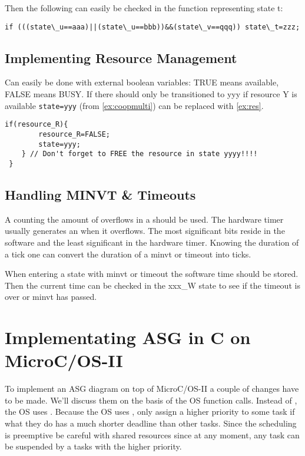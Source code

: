 \documentclass[../main.tex]{subfiles}
\begin{document}
Then the following can easily be checked in the function representing state t:
\begin{center}
\lstinline{if (((state\_u==aaa)||(state\_u==bbb))&&(state\_v==qqq)) state\_t=zzz;}
\end{center}

\subsection{Implementing Resource Management}
Can easily be done with external boolean variables: TRUE means available, FALSE means BUSY.
If there should only be transitioned to yyy if resource Y is available \lstinline{state=yyy} (from \ref{ex:coopmulti}) can be replaced with \ref{ex:res}.

\begin{lstlisting}[caption=Example of implementing resource management., label=ex:res]
	if(resource_R){
		resource_R=FALSE;
		state=yyy;
	} // Don't forget to FREE the resource in state yyyy!!!!
 }
\end{lstlisting}
\subsection{Handling MINVT \& Timeouts}
A  counting the amount of overflows in a  should be used.
The hardware timer usually generates an  when it overflows.
The most significant bits reside in the software and the least significant in the hardware timer.
Knowing the duration of a tick one can convert the duration of a minvt or timeout into ticks.

When entering a state with minvt or timeout the software time should be stored.
Then the current time can be checked in the xxx\_W state to see if the timeout is over or minvt has passed.


\section{Implementating ASG in C on MicroC/OS-II}

To implement an ASG diagram on top of MicroC/OS-II a couple of changes have to be made.
We'll discuss them on the basis of the OS function calls.
Instead of , the OS uses .
Because the OS uses , only assign a higher priority to some task if what they do has a much shorter deadline than other tasks.
Since the scheduling is preemptive be careful with shared resources since at any moment, any task can be suspended by a tasks with the higher priority.
\end{document}
